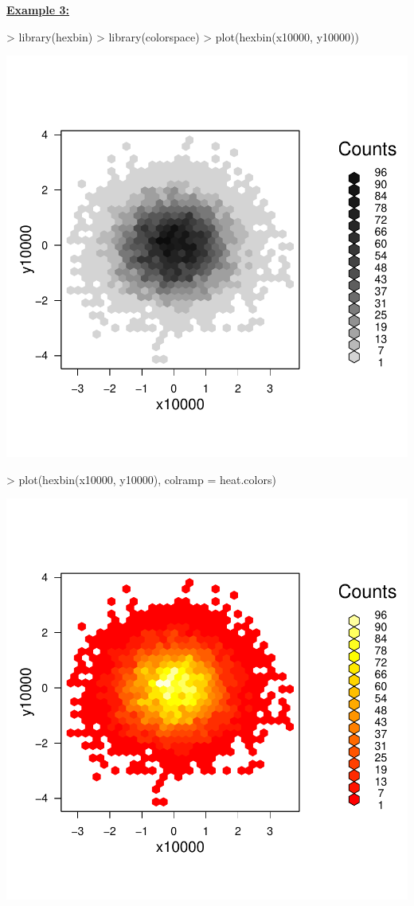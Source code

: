 \documentclass[12pt,letterpaper,final]{article}
\begin{document}
\underline{\bf Example 3:}
%
\begin{Schunk}
\begin{Sinput}
> library(hexbin)
> library(colorspace)
> plot(hexbin(x10000, y10000))
\end{Sinput}
\end{Schunk}
\includegraphics{lect_main-009}

\begin{Schunk}
\begin{Sinput}
> plot(hexbin(x10000, y10000), colramp = heat.colors)
\end{Sinput}
\end{Schunk}
\includegraphics{lect_main-010}
\end{document}
